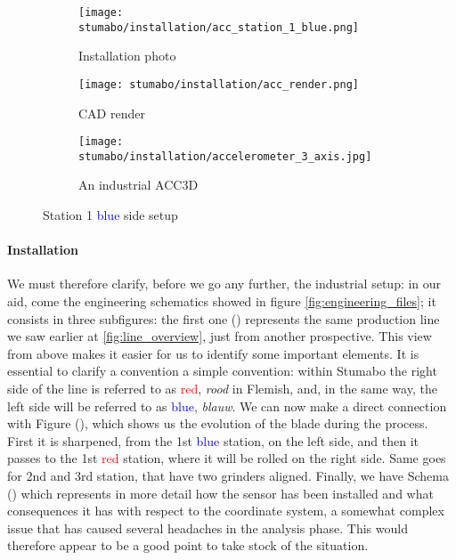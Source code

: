 \begin{figure}[ht]
    \begin{subfigure}{0.33\textwidth}
        \centering
        \texttt{[image: stumabo/installation/acc\_station\_1\_blue.png]}
        \caption{Installation photo}
        \label{fig:s1b_foto}
    \end{subfigure}
    \begin{subfigure}{0.33\textwidth}
        \centering
        \texttt{[image: stumabo/installation/acc\_render.png]}
        \caption{CAD render}
        \label{fig:s1b_render}
    \end{subfigure}
    \begin{subfigure}{0.32\textwidth}
        \centering
        \texttt{[image: stumabo/installation/accelerometer\_3\_axis.jpg]}
        \caption{An industrial ACC3D}
        \label{fig:stumabo_acc3d}
    \end{subfigure}
    \caption{Station 1 \textcolor{blue}{blue} side setup}
    \label{fig:stu_station1_b}
\end{figure}

\paragraph{Installation} We must therefore clarify, before we go any further, the industrial setup: in our aid, come the engineering schematics showed in figure \ref{fig:engineering_files};
it consists in three subfigures: the first one () represents the same production line we saw earlier at \ref{fig:line_overview}, just from another prospective. 
This view from above makes it easier for us to identify some important elements. 
It is essential to clarify a convention a simple convention: within Stumabo the right side of the line is referred to as \textcolor{red}{red}, \textit{rood} in Flemish, and, in the same way, 
the left side will be referred to as \textcolor{blue}{blue}, \textit{blauw}. 
We can now make a direct connection with Figure (), which shows us the evolution of the blade during the process.
First it is sharpened, from the 1st \textcolor{blue}{blue} station, on the left side, and then it passes to the 1st \textcolor{red}{red} station, where it will be rolled on the right side. 
Same goes for 2nd and 3rd station, that have two grinders aligned.
Finally, we have Schema () which represents in more detail how the sensor has been installed and what consequences it has with respect to the coordinate system, 
a somewhat complex issue that has caused several headaches in the analysis phase. This would therefore appear to be a good point to take stock of the situation.


